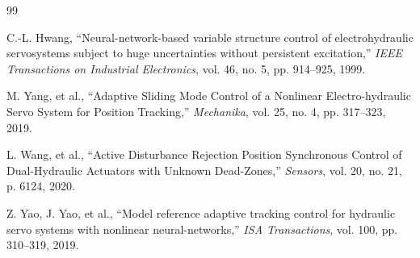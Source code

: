 \documentclass[12pt,a4paper]{article}
\begin{document}
\begin{thebibliography}{99}

C.-L. Hwang, ``Neural-network-based variable structure control of electrohydraulic servosystems subject to huge uncertainties without persistent excitation,'' \emph{IEEE Transactions on Industrial Electronics}, vol. 46, no. 5, pp. 914--925, 1999.

M. Yang, et al., ``Adaptive Sliding Mode Control of a Nonlinear Electro-hydraulic Servo System for Position Tracking,'' \emph{Mechanika}, vol. 25, no. 4, pp. 317--323, 2019.

L. Wang, et al., ``Active Disturbance Rejection Position Synchronous Control of Dual-Hydraulic Actuators with Unknown Dead-Zones,'' \emph{Sensors}, vol. 20, no. 21, p. 6124, 2020.

Z. Yao, J. Yao, et al., ``Model reference adaptive tracking control for hydraulic servo systems with nonlinear neural-networks,'' \emph{ISA Transactions}, vol. 100, pp. 310--319, 2019.

\end{thebibliography}
\end{document}
